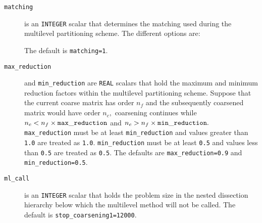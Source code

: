 \begin{description}

\item[\texttt{matching}] is an {\tt INTEGER} scalar that determines the matching used during the multilevel partitioning scheme. The different options are: 
The default is {\tt matching=1}.



\item[\texttt{max\_reduction}] and {\tt min\_reduction} are {\tt REAL} scalars that hold the maximum and minimum reduction factors within the multilevel partitioning scheme. Suppose that the current coarse matrix has order $n_f$ and 
the subsequently coarsened matrix would have order $n_c,$ coarsening continues while $n_c<n_f\times{\tt max\_reduction}$ and 
$n_c>n_f\times{\tt min\_reduction}.$ {\tt max\_reduction} must be at least {\tt min\_reduction} and values greater than 
{\tt 1.0} are treated as {\tt 1.0}. {\tt min\_reduction} must be at least {\tt 0.5} and values less than 
{\tt 0.5} are treated as {\tt 0.5}. The defaults are {\tt max\_reduction=0.9} and {\tt min\_reduction=0.5}.




\item[\texttt{ml\_call}] is an {\tt INTEGER} scalar that holds the problem size in the nested dissection hierarchy below which the multilevel method will not be called.
The default is {\tt stop\_coarsening1=12000}.







\end{description}

